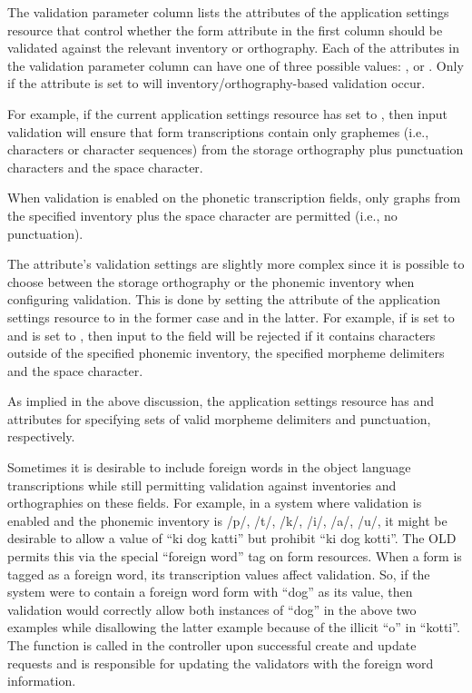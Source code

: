 \documentclass[letterpaper,10pt,english]{sphinxmanual}
\begin{document}
The validation parameter column lists the attributes of the application settings
resource that control whether the form attribute in the first column should be
validated against the relevant inventory or orthography.  Each of the attributes
in the validation parameter column can have one of three possible values:
,  or .  Only if the attribute is set to 
will inventory/orthography-based validation occur.

For example, if the current application settings resource has
 set to , then input validation will ensure
that form transcriptions contain only graphemes (i.e., characters or character
sequences) from the storage orthography plus punctuation characters and the
space character.

When validation is enabled on the phonetic transcription fields, only graphs
from the specified inventory plus the space character are permitted (i.e., no
punctuation).

The  attribute's validation settings are slightly more complex
since it is possible to choose between the storage orthography or the phonemic
inventory when configuring validation.  This is done by setting the
 attribute of the application settings resource
to  in the former case and  in the latter.  For example,
if  is set to  and
 is set to , then input to the
 field will be rejected if it contains characters outside of
the specified phonemic inventory, the specified morpheme delimiters and the
space character.

As implied in the above discussion, the application settings resource has
 and  attributes for specifying sets of
valid morpheme delimiters and punctuation, respectively.

Sometimes it is desirable to include foreign words in the object language
transcriptions while still permitting validation against inventories and
orthographies on these fields.  For example, in a system where 
validation is enabled and the phonemic inventory is /p/, /t/, /k/, /i/, /a/,
/u/, it might be desirable to allow a  value of ``ki dog katti''
but prohibit ``ki dog kotti''.  The OLD permits this via the special ``foreign
word'' tag on form resources.  When a form is tagged as a foreign word, its
transcription values affect validation.  So, if the system were to contain a
foreign word form with ``dog'' as its  value, then validation
would correctly allow both instances of ``dog'' in the above two examples while
disallowing the latter example because of the illicit ``o'' in ``kotti''.  The
function  is called in the
 controller upon successful create and update requests and is
responsible for updating the validators with the foreign word information.
\end{document}
